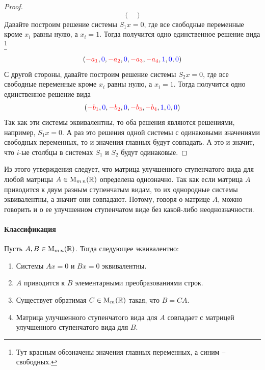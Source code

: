 \begin{proof}
\[\begin{pmatrix}
\end{pmatrix}
\]
Давайте построим решение системы $S_1 x = 0$, где все свободные переменные кроме $x_i$ равны нулю, а $x_i = 1$.
Тогда получится одно единственное решение вида%
\footnote{Тут красным обозначены значения главных переменных, а синим -- свободных.}
\[
({\color{red} -a_1}, {\color{blue} 0}, {\color{red} -a_2}, {\color{blue} 0}, {\color{red} -a_3}, {\color{red} -a_4}, {\color{blue} 1}, {\color{blue} 0}, {\color{blue} 0})
\]
С другой стороны, давайте построим решение системы $S_2 x = 0$, где все свободные переменные кроме $x_i$ равны нулю, а $x_i = 1$.
Тогда получится одно единственное решение вида
\[
({\color{red} -b_1}, {\color{blue} 0}, {\color{red} -b_2}, {\color{blue} 0}, {\color{red} -b_3}, {\color{red} -b_4}, {\color{blue} 1}, {\color{blue} 0}, {\color{blue} 0})
\]
Так как эти системы эквивалентны, то оба решения являются решениями, например, $S_1x = 0$.
А раз это решения одной системы с одинаковыми значениями свободных переменных, то и значения главных будут совпадать.
А это и значит, что $i$-ые столбцы в системах $S_1$ и $S_2$ будут одинаковые.
\end{proof}

Из этого утверждения следует, что матрица улучшенного ступенчатого вида для любой матрицы $A\in\operatorname{M}_{m\,n}(\mathbb R)$ определена однозначно.
Так как если матрица $A$ приводится к двум разным ступенчатым видам, то их однородные системы эквивалентны, а значит они совпадают.
Потому, говоря о матрице $A$, можно говорить и о ее улучшенном ступенчатом виде без какой-либо неоднозначности.

\paragraph{Классификация}

\begin{claim}
Пусть $A,B\in\operatorname{M}_{m\,n}(\mathbb R)$.
Тогда следующее эквивалентно:
\begin{enumerate}
\item Системы $Ax = 0$ и $Bx = 0$ эквивалентны.

\item $A$ приводится к $B$ элементарными преобразованиями строк.

\item Существует обратимая $C\in\operatorname{M}_{m}(\mathbb R)$ такая, что $B = CA$.

\item Матрица улучшенного ступенчатого вида для $A$ совпадает с матрицей улучшенного ступенчатого вида для $B$.
\end{enumerate}
\end{claim}

